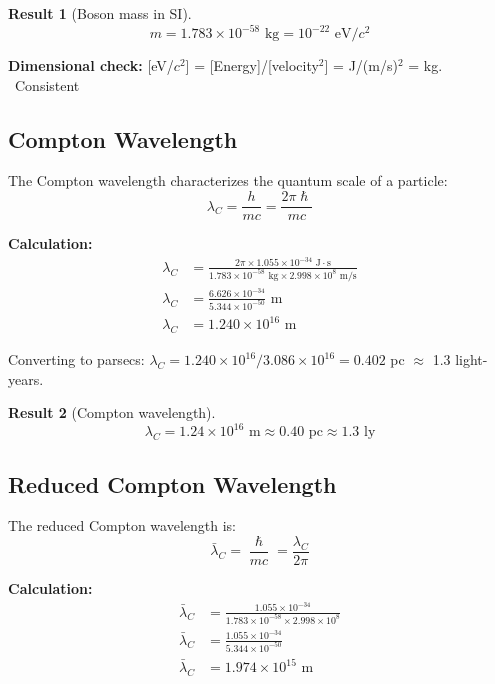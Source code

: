 \documentclass[11pt,a4paper]{article}
\newcommand{\ee}[1]{\times 10^{#1}}
\newcommand{\hbar}{\ensuremath{\hslash}}
\newcommand{\CONSISTENT}{\textcolor{green!60!black}{\checkmark~Consistent}}
\newtheorem{result}{Result}
\begin{document}
\begin{result}[Boson mass in SI]
\begin{equation}
\boxed{m = 1.783 \times 10^{-58} \text{ kg} = 10^{-22} \text{ eV}/c^2}
\end{equation}
\end{result}

\textbf{Dimensional check:} [eV/$c^2$] = [Energy]/[velocity$^2$] = J/(m/s)$^2$ = kg. \CONSISTENT

\subsection{Compton Wavelength}

The Compton wavelength characterizes the quantum scale of a particle:
\begin{equation}
\lambda_C = \frac{h}{mc} = \frac{2\pi\hbar}{mc}
\end{equation}

\textbf{Calculation:}
\begin{align}
\lambda_C &= \frac{2\pi \times 1.055 \ee{-34} \text{ J}\cdot\text{s}}{1.783 \ee{-58} \text{ kg} \times 2.998 \ee{8} \text{ m/s}} \nonumber \\
\lambda_C &= \frac{6.626 \ee{-34}}{5.344 \ee{-50}} \text{ m} \nonumber \\
\lambda_C &= 1.240 \ee{16} \text{ m}
\end{align}

Converting to parsecs: $\lambda_C = 1.240 \ee{16} / 3.086 \ee{16} = 0.402$ pc $\approx$ 1.3 light-years.

\begin{result}[Compton wavelength]
\begin{equation}
\boxed{\lambda_C = 1.24 \times 10^{16} \text{ m} \approx 0.40 \text{ pc} \approx 1.3 \text{ ly}}
\end{equation}
\end{result}

\subsection{Reduced Compton Wavelength}

The reduced Compton wavelength is:
\begin{equation}
\bar{\lambda}_C = \frac{\hbar}{mc} = \frac{\lambda_C}{2\pi}
\end{equation}

\textbf{Calculation:}
\begin{align}
\bar{\lambda}_C &= \frac{1.055 \ee{-34}}{1.783 \ee{-58} \times 2.998 \ee{8}} \nonumber \\
\bar{\lambda}_C &= \frac{1.055 \ee{-34}}{5.344 \ee{-50}} \nonumber \\
\bar{\lambda}_C &= 1.974 \ee{15} \text{ m}
\end{align}
\end{document}
